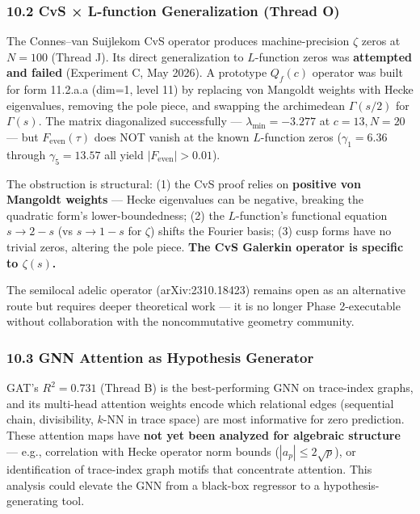 \documentclass[
]{article}
\begin{document}
\hypertarget{cvs-l-function-generalization-thread-o}{%
\subsubsection{10.2 CvS × L-function Generalization (Thread
O)}\label{cvs-l-function-generalization-thread-o}}

The Connes--van Suijlekom CvS operator produces machine-precision
\(\zeta\) zeros at \(N=100\) (Thread J). Its direct generalization to
\(L\)-function zeros was \textbf{attempted and failed} (Experiment C,
May 2026). A prototype \(Q_f(c)\) operator was built for form 11.2.a.a
(dim=1, level 11) by replacing von Mangoldt weights with Hecke
eigenvalues, removing the pole piece, and swapping the archimedean
\(\Gamma(s/2)\) for \(\Gamma(s)\). The matrix diagonalized successfully
--- \(\lambda_{\min} = -3.277\) at \(c=13,N=20\) --- but
\(F_{\text{even}}(\tau)\) does NOT vanish at the known \(L\)-function
zeros (\(\gamma_1 = 6.36\) through \(\gamma_5 = 13.57\) all yield
\(|F_{\text{even}}| > 0.01\)).

The obstruction is structural: (1) the CvS proof relies on
\textbf{positive von Mangoldt weights} --- Hecke eigenvalues can be
negative, breaking the quadratic form's lower-boundedness; (2) the
\(L\)-function's functional equation \(s \to 2-s\) (vs \(s \to 1-s\) for
\(\zeta\)) shifts the Fourier basis; (3) cusp forms have no trivial
zeros, altering the pole piece. \textbf{The CvS Galerkin operator is
specific to \(\zeta(s)\).}

The semilocal adelic operator (arXiv:2310.18423) remains open as an
alternative route but requires deeper theoretical work --- it is no
longer Phase 2-executable without collaboration with the noncommutative
geometry community.

\hypertarget{gnn-attention-as-hypothesis-generator}{%
\subsubsection{10.3 GNN Attention as Hypothesis
Generator}\label{gnn-attention-as-hypothesis-generator}}

GAT's \(R^2 = 0.731\) (Thread B) is the best-performing GNN on
trace-index graphs, and its multi-head attention weights encode which
relational edges (sequential chain, divisibility, \(k\)-NN in trace
space) are most informative for zero prediction. These attention maps
have \textbf{not yet been analyzed for algebraic structure} --- e.g.,
correlation with Hecke operator norm bounds (\(|a_p| \le 2\sqrt{p}\)),
or identification of trace-index graph motifs that concentrate
attention. This analysis could elevate the GNN from a black-box
regressor to a hypothesis-generating tool.
\end{document}
